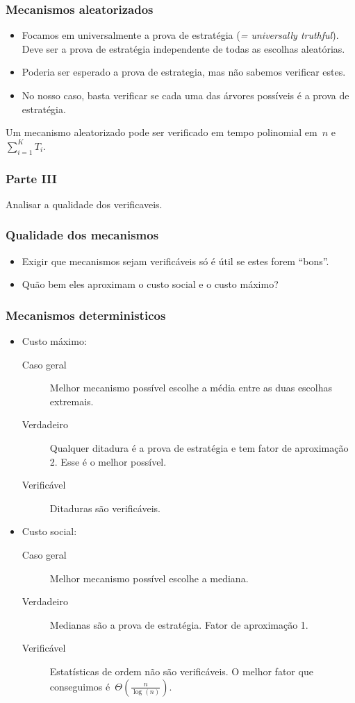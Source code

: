 \documentclass{beamer}
\begin{document}
\begin{frame}
\frametitle{Mecanismos aleatorizados}

\begin{itemize}
\item Focamos em universalmente a prova de estratégia (\textit{= universally truthful}). Deve ser a prova de estratégia independente de todas as escolhas aleatórias.
\item Poderia ser esperado a prova de estrategia, mas não sabemos verificar estes.
\item No nosso caso, basta verificar se cada uma das árvores possíveis é a prova de estratégia.
\end{itemize}

\begin{theorem}
Um mecanismo aleatorizado pode ser verificado em tempo polinomial em~$n$ e~$\sum\limits_{i=1}^K T_i$.
\end{theorem}
\end{frame}

\begin{frame}
\frametitle{Parte III}
Analisar a qualidade dos verificaveis.
\end{frame}

\begin{frame}
\frametitle{Qualidade dos mecanismos}

\begin{itemize}
    \item Exigir que mecanismos sejam verificáveis só é útil se estes forem ``bons''.
    \item Quão bem eles aproximam o custo social e o custo máximo?
\end{itemize}

\end{frame}

\begin{frame}
\frametitle{Mecanismos deterministicos}

\begin{itemize}
\item Custo máximo:
\begin{description}
\item [Caso geral] Melhor mecanismo possível escolhe a média entre as duas escolhas extremais.
\item [Verdadeiro] Qualquer ditadura é a prova de estratégia e tem fator de aproximação 2. Esse é o melhor possível.
\item [Verificável] Ditaduras são verificáveis.
\end{description}
\item Custo social:
\begin{description}
\item [Caso geral] Melhor mecanismo possível escolhe a mediana.
\item [Verdadeiro] Medianas são a prova de estratégia. Fator de aproximação 1.
\item [Verificável] Estatísticas de ordem não são verificáveis. O melhor fator que conseguimos é~$\Theta(\frac{n}{\log(n)})$.
\end{description}
\end{itemize}

\end{frame}
\end{document}
